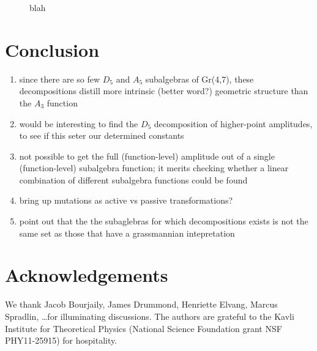 \documentclass[11pt]{article}
\begin{document}
\begin{figure}[t]   \centering
  \caption{blah}
\label{fig:R27_decompositions}
\end{figure}




\section{Conclusion}

\begin{enumerate}
\item since there are so few $D_5$ and $A_5$ subalgebras of Gr(4,7), these decompositions distill more intrinsic (better word?) geometric structure than the $A_3$ function 
\item would be interesting to find the $D_5$ decomposition of higher-point amplitudes, to see if this seter our determined constants
\item not possible to get the full (function-level) amplitude out of a single (function-level) subalgebra function; it merits checking whether a linear combination of different subalgebra functions could be found
\item bring up mutations as active vs passive transformations?
\item point out that the the subaglebras for which decompositions exists is not the same set as those that have a grassmannian intepretation
\end{enumerate}

\section*{Acknowledgements}

We thank Jacob Bourjaily, James Drummond, Henriette Elvang, Marcus Spradlin, \dots for illuminating discussions. The authors are grateful to the Kavli Institute for Theoretical Physics (National Science Foundation grant NSF PHY11-25915) for hospitality. 
\end{document}
